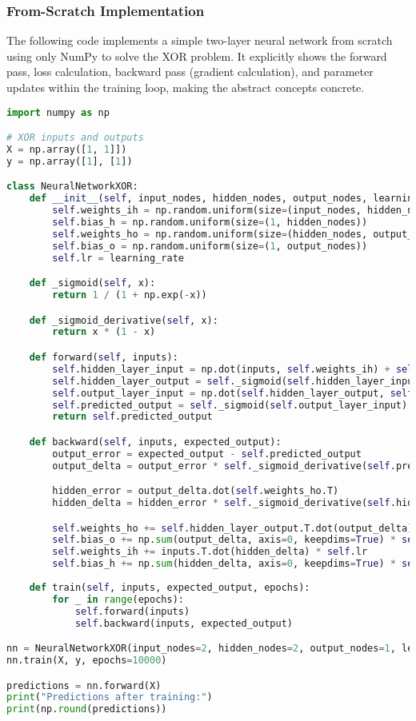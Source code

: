 \documentclass[11pt,a4paper]{article}
\begin{document}
\subsubsection{From-Scratch Implementation}

The following code implements a simple two-layer neural network from scratch using only NumPy to solve the XOR problem. It explicitly shows the forward pass, loss calculation, backward pass (gradient calculation), and parameter updates within the training loop, making the abstract concepts concrete.

\begin{lstlisting}[language=Python]
import numpy as np

# XOR inputs and outputs
X = np.array([1, 1]])
y = np.array([1], [1])

class NeuralNetworkXOR:
    def __init__(self, input_nodes, hidden_nodes, output_nodes, learning_rate):
        self.weights_ih = np.random.uniform(size=(input_nodes, hidden_nodes))
        self.bias_h = np.random.uniform(size=(1, hidden_nodes))
        self.weights_ho = np.random.uniform(size=(hidden_nodes, output_nodes))
        self.bias_o = np.random.uniform(size=(1, output_nodes))
        self.lr = learning_rate

    def _sigmoid(self, x):
        return 1 / (1 + np.exp(-x))

    def _sigmoid_derivative(self, x):
        return x * (1 - x)

    def forward(self, inputs):
        self.hidden_layer_input = np.dot(inputs, self.weights_ih) + self.bias_h
        self.hidden_layer_output = self._sigmoid(self.hidden_layer_input)
        self.output_layer_input = np.dot(self.hidden_layer_output, self.weights_ho) + self.bias_o
        self.predicted_output = self._sigmoid(self.output_layer_input)
        return self.predicted_output

    def backward(self, inputs, expected_output):
        output_error = expected_output - self.predicted_output
        output_delta = output_error * self._sigmoid_derivative(self.predicted_output)

        hidden_error = output_delta.dot(self.weights_ho.T)
        hidden_delta = hidden_error * self._sigmoid_derivative(self.hidden_layer_output)

        self.weights_ho += self.hidden_layer_output.T.dot(output_delta) * self.lr
        self.bias_o += np.sum(output_delta, axis=0, keepdims=True) * self.lr
        self.weights_ih += inputs.T.dot(hidden_delta) * self.lr
        self.bias_h += np.sum(hidden_delta, axis=0, keepdims=True) * self.lr
    
    def train(self, inputs, expected_output, epochs):
        for _ in range(epochs):
            self.forward(inputs)
            self.backward(inputs, expected_output)

nn = NeuralNetworkXOR(input_nodes=2, hidden_nodes=2, output_nodes=1, learning_rate=0.1)
nn.train(X, y, epochs=10000)

predictions = nn.forward(X)
print("Predictions after training:")
print(np.round(predictions))
\end{lstlisting}
\end{document}
